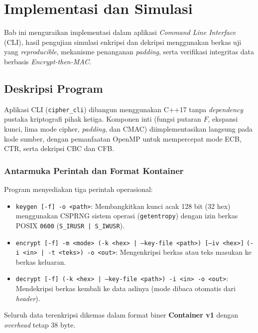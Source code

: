 \section{Implementasi dan Simulasi}
Bab ini menguraikan implementasi \algname{} dalam aplikasi \textit{Command Line Interface} (CLI), hasil pengujian simulasi enkripsi dan dekripsi menggunakan berkas uji yang \textit{reproducible}, mekanisme penanganan \textit{padding}, serta verifikasi integritas data berbasis \textit{Encrypt-then-MAC}.

\subsection{Deskripsi Program}
Aplikasi CLI (\texttt{cipher\_cli}) dibangun menggunakan C++17 tanpa \textit{dependency} pustaka kriptografi pihak ketiga. Komponen inti (fungsi putaran $F$, ekspansi kunci, lima mode cipher, \textit{padding}, dan CMAC) diimplementasikan langsung pada kode sumber, dengan pemanfaatan OpenMP untuk mempercepat mode ECB, CTR, serta dekripsi CBC dan CFB.

\subsubsection{Antarmuka Perintah dan Format Kontainer}
Program menyediakan tiga perintah operasional:
\begin{itemize}
  \item \texttt{keygen [-f] -o <path>}: Membangkitkan kunci acak 128 bit (32 hex) menggunakan CSPRNG sistem operasi (\texttt{getentropy}) dengan izin berkas POSIX \texttt{0600} (\texttt{S\_IRUSR | S\_IWUSR}).
  \item \texttt{encrypt [-f] -m <mode> (-k <hex> | --key-file <path>) [--iv <hex>]}\linebreak
    \texttt{(-i <in> | -t <teks>) -o <out>}: Mengenkripsi berkas atau teks masukan ke berkas keluaran.
  \item \texttt{decrypt [-f] (-k <hex> | --key-file <path>) -i <in> -o <out>}: Mendekripsi berkas kembali ke data aslinya (mode dibaca otomatis dari \textit{header}).
\end{itemize}

Seluruh data terenkripsi dikemas dalam format biner \textbf{Container v1} dengan \textit{overhead} tetap 38 byte.

